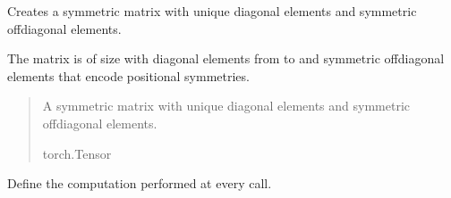 \documentclass[letterpaper,10pt,english]{sphinxmanual}
\begin{document}

\begin{fulllineitems}
\label{\detokenize{modules:Resnet.ResNet}}
\pysigstartsignatures
{}
\pysigstopsignatures{}

\begin{fulllineitems}
\label{\detokenize{modules:Resnet.ResNet.create_coordinate_matrix}}
\pysigstartsignatures
{}
\pysigstopsignatures
\sphinxAtStartPar
Creates a symmetric matrix with unique diagonal elements and symmetric off\sphinxhyphen{}diagonal elements.

\sphinxAtStartPar
The matrix is of size  with diagonal elements from  to 
and symmetric off\sphinxhyphen{}diagonal elements that encode positional symmetries.
\begin{quote}\begin{description}
\sphinxAtStartPar
A symmetric matrix with unique diagonal elements and symmetric off\sphinxhyphen{}diagonal elements.

\sphinxAtStartPar
torch.Tensor

\end{description}\end{quote}

\end{fulllineitems}


\begin{fulllineitems}
\label{\detokenize{modules:Resnet.ResNet.forward}}
\pysigstartsignatures
{}
\pysigstopsignatures
\sphinxAtStartPar
Define the computation performed at every call.


\end{fulllineitems}
\end{fulllineitems}
\end{document}
